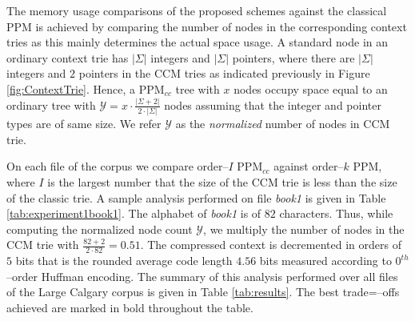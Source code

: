 \documentclass[runningheads,a4paper]{llncs}
\begin{document}
The memory usage comparisons of the proposed schemes against the classical {PPM} is achieved by comparing the number of
nodes in the corresponding context tries as this mainly determines the actual space usage. 
A standard node in an ordinary context trie has $|\Sigma|$ integers and $|\Sigma|$ pointers, where there are
$|\Sigma|$ integers and $2$ pointers in the CCM tries as indicated previously in Figure \ref{fig:ContextTrie}. 
Hence, a PPM$_{cc}$ tree with $x$ nodes occupy space equal to an ordinary tree with $\mathcal{Y} = x \cdot \frac{|\Sigma
+ 2|}{2 \cdot |\Sigma|}$ nodes assuming that the integer and pointer types are of same size. 
We refer $\mathcal{Y}$ as the \emph{normalized} number of nodes in CCM trie. 


On each file of the corpus we compare order--$I$ PPM$_{cc}$ against order--$k$ PPM, where $I$ is the largest number
that the size of the CCM trie is less than the size of the classic trie. 
A sample analysis performed on file \emph{book1} is given in Table \ref{tab:experiment1book1}. 
The alphabet  of \emph{book1} is of $82$ characters. Thus, while computing the normalized node count
$\mathcal{Y}$, we multiply the number of nodes in the CCM trie with $\frac{82+2}{2\cdot82} = 0.51$. The compressed
context is decremented in orders of $5$ bits that is the rounded average code length $4.56$ bits measured
according to $0^{th}$--order Huffman encoding. The summary of this analysis performed over all files of the Large
Calgary
corpus is given in Table \ref{tab:results}. The best trade=--offs achieved are marked in bold throughout the table.
\end{document}

